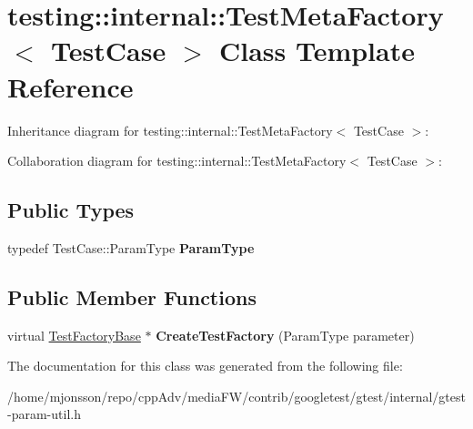 \hypertarget{classtesting_1_1internal_1_1TestMetaFactory}{}\section{testing\+:\+:internal\+:\+:Test\+Meta\+Factory$<$ Test\+Case $>$ Class Template Reference}
\label{classtesting_1_1internal_1_1TestMetaFactory}


Inheritance diagram for testing\+:\+:internal\+:\+:Test\+Meta\+Factory$<$ Test\+Case $>$\+:


Collaboration diagram for testing\+:\+:internal\+:\+:Test\+Meta\+Factory$<$ Test\+Case $>$\+:
\subsection*{Public Types}
\begin{DoxyCompactItemize}
\item 
\mbox{\label{classtesting_1_1internal_1_1TestMetaFactory_a9c12e442b4389381b948ed669fcf0f84}} 
typedef Test\+Case\+::\+Param\+Type {\bfseries Param\+Type}
\end{DoxyCompactItemize}
\subsection*{Public Member Functions}
\begin{DoxyCompactItemize}
\item 
\mbox{\label{classtesting_1_1internal_1_1TestMetaFactory_ae9f5334c68af309bca8f7ec29d837e38}} 
virtual \hyperlink{classtesting_1_1internal_1_1TestFactoryBase}{Test\+Factory\+Base} $\ast$ {\bfseries Create\+Test\+Factory} (Param\+Type parameter)
\end{DoxyCompactItemize}


The documentation for this class was generated from the following file\+:\begin{DoxyCompactItemize}
\item 
/home/mjonsson/repo/cpp\+Adv/media\+F\+W/contrib/googletest/gtest/internal/gtest-\/param-\/util.\+h\end{DoxyCompactItemize}
